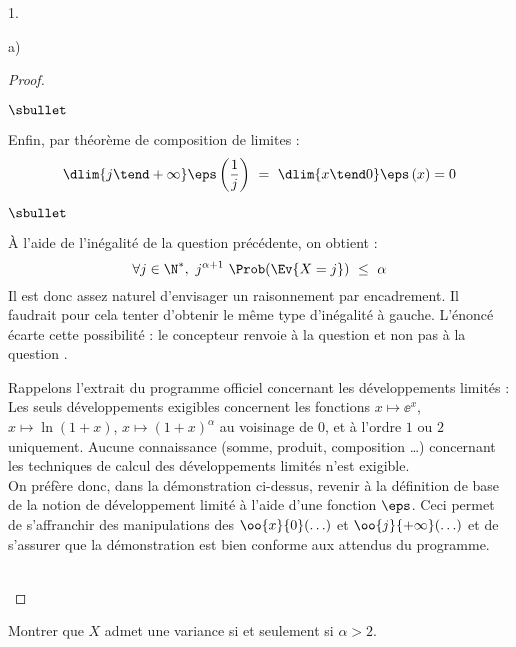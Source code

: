 \documentclass[11pt]{article}%
\begin{document}
\begin{noliste}{1.}
\begin{noliste}{a)}
\begin{proof}
\begin{noliste}{$\sbullet$}
      \item Enfin, par théorème de composition de limites :
        \[
        \dlim{j \tend +\infty} \eps\left( \dfrac{1}{j} \right) \ = \
        \dlim{x \tend 0} \eps\left( x \right) = 0
        \]
      \end{noliste}
      \begin{remark}%
        \begin{noliste}{$\sbullet$}
        \item À l'aide de l'inégalité de la question précédente, on
          obtient :
          \[
          \forall j \in \N^*, \ j^{\alpha + 1} \ \Prob(\Ev{X = j})
          \ \leq \ \alpha
          \]
          Il est donc assez naturel d'envisager un raisonnement par
          encadrement. Il faudrait pour cela tenter d'obtenir le même
          type d'inégalité à gauche. L'énoncé écarte cette possibilité
          : le concepteur renvoie à la question \itbf{3.c)} et non pas
          à la question \itbf{3.d)}.

        \item Rappelons l'extrait du programme officiel concernant les
          développements limités : \og Les seuls développements
          exigibles concernent les fonctions $x\mapsto \ee^x$, $x
          \mapsto \ln (1+x)$, $x \mapsto (1+x)^\alpha$ au voisinage de
          $0$, et à l'ordre $1$ ou $2$ uniquement. Aucune connaissance
          (somme, produit, composition \ldots) concernant les
          techniques de calcul des développements limités n'est
          \hbox{exigible.} \fg{}\\
          On préfère donc, dans la démonstration ci-dessus, revenir à
          la définition de base de la notion de développement limité à
          l'aide d'une fonction $\eps$. Ceci permet de s'affranchir
          des manipulations des $\oo{x}{0}(\ldots)$ et
          $\oo{j}{+\infty}(\ldots)$ et de s'assurer que la
          démonstration est bien conforme aux attendus du programme.
        \end{noliste}
      \end{remark}~\\[-1.4cm]
    \end{proof}

    
    \newpage


  \item Montrer que $X$ admet une variance si et seulement si $\alpha 
    >2$. 


\end{noliste}
\end{noliste}
\end{document}
